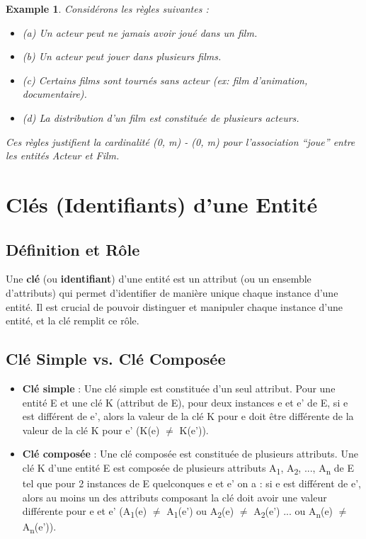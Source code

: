 \documentclass{article}
\newtheorem{example}{Example}
\begin{document}
\begin{example}
    Considérons les règles suivantes :
    \begin{itemize}
        \item (a) Un acteur peut ne jamais avoir joué dans un film.
        \item (b) Un acteur peut jouer dans plusieurs films.
        \item (c) Certains films sont tournés sans acteur (ex: film d'animation, documentaire).
        \item (d) La distribution d'un film est constituée de plusieurs acteurs.
    \end{itemize}
    Ces règles justifient la cardinalité (0, m) - (0, m) pour l'association ``joue'' entre les entités Acteur et Film.
\end{example}


\section{Clés (Identifiants) d'une Entité}

\subsection{Définition et Rôle}

Une \textbf{clé} (ou \textbf{identifiant}) d'une entité est un attribut (ou un ensemble d'attributs) qui permet d'identifier de manière unique chaque instance d'une entité.  Il est crucial de pouvoir distinguer et manipuler chaque instance d'une entité, et la clé remplit ce rôle.

\subsection{Clé Simple vs. Clé Composée}

\begin{itemize}
    \item \textbf{Clé simple} :  Une clé simple est constituée d'un seul attribut.  Pour une entité E et une clé K (attribut de E), pour deux instances e et e' de E, si e est différent de e', alors la valeur de la clé K pour e doit être différente de la valeur de la clé K pour e' (K(e) $\neq$ K(e')).
    \item \textbf{Clé composée} : Une clé composée est constituée de plusieurs attributs.  Une clé K d'une entité E est composée de plusieurs attributs A\textsubscript{1}, A\textsubscript{2}, ..., A\textsubscript{n} de E tel que pour 2 instances de E quelconques e et e' on a : si e est différent de e', alors au moins un des attributs composant la clé doit avoir une valeur différente pour e et e' (A\textsubscript{1}(e) $\neq$ A\textsubscript{1}(e') ou A\textsubscript{2}(e) $\neq$ A\textsubscript{2}(e') ... ou A\textsubscript{n}(e) $\neq$ A\textsubscript{n}(e')).
\end{itemize}
\end{document}
